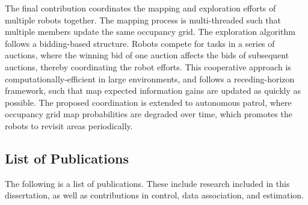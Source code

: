 The final contribution coordinates the mapping and exploration efforts of multiple robots together. The mapping process is multi-threaded such that multiple members update the same occupancy grid. The exploration algorithm follows a bidding-based structure. Robots compete for tasks in a series of auctions, where the winning bid of one auction affects the bids of subsequent auctions, thereby coordinating the robot efforts. This cooperative approach is computationally-efficient in large environments, and follows a receding-horizon framework, such that map expected information gains are updated as quickly as possible. The proposed coordination is extended to autonomous patrol, where occupancy grid map probabilities are degraded over time, which promotes the robots to revisit areas periodically.

\subsection{List of Publications}

The following is a list of publications. These include research included in this dissertation, as well as contributions in control, data association, and estimation.


